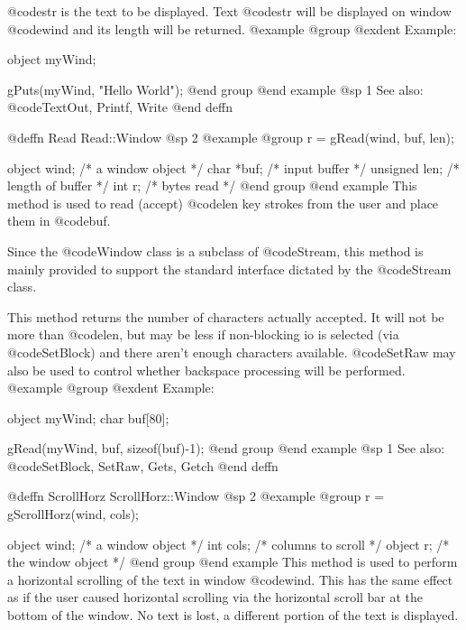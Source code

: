 @code{str} is the text to be displayed. Text @code{str} will be
displayed on window @code{wind} and its length will be returned.
@example
@group
@exdent Example:

object  myWind;

gPuts(myWind, "Hello World\n");
@end group
@end example
@sp 1
See also:  @code{TextOut, Printf, Write}
@end deffn











@deffn {Read} Read::Window
@sp 2
@example
@group
r = gRead(wind, buf, len);

object   wind;  /*  a window object       */
char    *buf;   /*  input buffer          */
unsigned len;   /*  length of buffer      */
int      r;     /*  bytes read            */
@end group
@end example
This method is used to read (accept) @code{len} key strokes from the user
and place them in @code{buf}.

Since the @code{Window} class is a subclass of @code{Stream}, this
method is mainly provided to support the standard interface dictated by
the @code{Stream} class.

This method returns the number of characters actually accepted.  It will
not be more than @code{len}, but may be less if non-blocking io is selected
(via @code{SetBlock}) and there aren't enough characters available.
@code{SetRaw} may also be used to control whether backspace processing will
be performed.
@example
@group
@exdent Example:

object  myWind;
char    buf[80];

gRead(myWind, buf, sizeof(buf)-1);
@end group
@end example
@sp 1
See also:  @code{SetBlock, SetRaw, Gets, Getch}
@end deffn














@deffn {ScrollHorz} ScrollHorz::Window
@sp 2
@example
@group
r = gScrollHorz(wind, cols);

object  wind;   /*  a window object     */
int     cols;   /*  columns to scroll   */
object  r;      /*  the window object   */
@end group
@end example
This method is used to perform a horizontal scrolling of the text in
window @code{wind}.  This has the same effect as if the user caused
horizontal scrolling via the horizontal scroll bar at the bottom
of the window.  No text is lost, a different portion of the text is
displayed.

